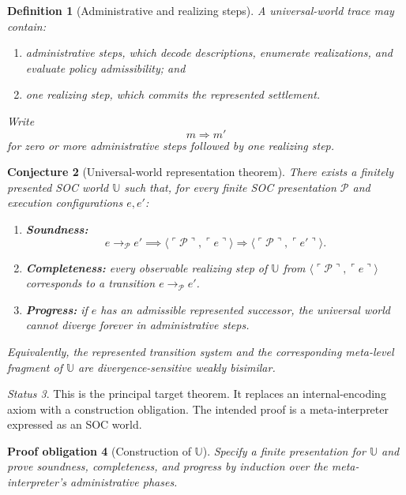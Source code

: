 \documentclass[11pt]{article}
\newtheorem{definition}{Definition}[section]
\newtheorem{obligation}[definition]{Proof obligation}
\newtheorem{conjecture}[definition]{Conjecture}
\theoremstyle{remark}
\newtheorem{status}[definition]{Status}
\newcommand{\U}{\mathbb{U}}
\newcommand{\Pres}{\mathcal{P}}
\newcommand{\enc}[1]{\ulcorner #1 \urcorner}
\newcommand{\weakstep}{\Rightarrow}
\begin{document}
\begin{definition}[Administrative and realizing steps]
A universal-world trace may contain:
\begin{enumerate}[label=(\roman*)]
  \item \emph{administrative steps}, which decode descriptions, enumerate
        realizations, and evaluate policy admissibility; and
  \item one \emph{realizing step}, which commits the represented settlement.
\end{enumerate}
Write
\[
  m\weakstep m'
\]
for zero or more administrative steps followed by one realizing step.
\end{definition}

\begin{conjecture}[Universal-world representation theorem]
There exists a finitely presented SOC world $\U$ such that, for every finite
SOC presentation $\Pres$ and execution configurations $e,e'$:
\begin{enumerate}[label=(\roman*)]
  \item \textbf{Soundness:}
  \[
    e\to_{\Pres}e'
    \implies
    \langle\enc{\Pres},\enc{e}\rangle
    \weakstep
    \langle\enc{\Pres},\enc{e'}\rangle.
  \]
  \item \textbf{Completeness:}
  every observable realizing step of $\U$ from
  $\langle\enc{\Pres},\enc{e}\rangle$ corresponds to a transition
  $e\to_{\Pres}e'$.
  \item \textbf{Progress:}
  if $e$ has an admissible represented successor, the universal world cannot
  diverge forever in administrative steps.
\end{enumerate}
Equivalently, the represented transition system and the corresponding
meta-level fragment of $\U$ are divergence-sensitive weakly bisimilar.
\end{conjecture}

\begin{status}
This is the principal target theorem. It replaces an internal-encoding axiom
with a construction obligation. The intended proof is a meta-interpreter
expressed as an SOC world.
\end{status}

\begin{obligation}[Construction of $\U$]
Specify a finite presentation for $\U$ and prove soundness, completeness, and
progress by induction over the meta-interpreter's administrative phases.
\end{obligation}
\end{document}
